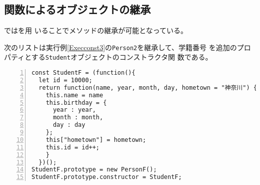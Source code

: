 \begin{Exec}
\section{関数によるオブジェクトの継承}
\JS ではを用
いることでメソッドの継承が可能となっている。
\begin{Exec}\upshape\label{Execconst4}
次のリストは実行例\ref{Execconst3}の\texttt{Person2}を継承して、学籍番号
 を追加のプロパティとする\texttt{Student}オブジェクトのコンストラクタ関
 数である。
\begin{Verbatim}[numbers=left]
const StudentF = (function(){
  let id = 10000;
  return function(name, year, month, day, hometown = "神奈川") {
    this.name = name
    this.birthday = {
      year : year,
      month : month,
      day : day
    };
    this["hometown"] = hometown;
    this.id = id++;
    }
  })();
StudentF.prototype = new PersonF();
StudentF.prototype.constructor = StudentF;
\end{Verbatim}
\end{Exec}
\iffalse
\begin{itemize}
 \item \texttt{name}などのプロパティはオブジェクトごとに違う値をとるので
       \texttt{Person2.rototype}内には置くことができない。したがって、そ
       れぞれを\texttt{this}のプロパティに格納する(２行目から６行目)。
 \item \texttt{Person2}の\texttt{prototype}を利用するために、
       \texttt{Student.prototype}にオブジェクトを新規に作成して代入する
       (8行目)。これにより、この後で\texttt{Person2}のプロパティが変更さ
       れても、\texttt{Student}オブジェクトには影響がでない。
 \item \texttt{Student.prototype.constructor}を\texttt{Student}に戻して
       おく(9行目)
\end{itemize}
実行結果は次のとおりである。
\begin{Verbatim}
>s = new Student("me",1323300,1995,4,1)
Student {name: "me", year: 1995, month: 4, day: 1, id: 1323300}
>s.age;
20
>s.name
"me"
>s+"";
"私の名前はmeです"
>s.constructor;
Student(n, id, y, m, d){
  this.name   = n;
  this.year  = y;
  this.month = m;
  this.day   = d;
  this.id    = id;
}
\end{Verbatim}
\texttt{Person2}で定義されたメソッドが利用できていることがわかる。
 \begin{Prob}\upshape
	実行例\ref{Execconst4}の\texttt{Student}に所属学部を表示するメソッドを
	追加しなさい。所属学部のプロパティは追加しないで学籍番号から求めること。
\end{Prob}
\fi

\end{Exec}
